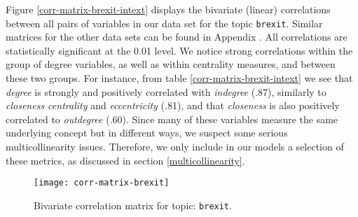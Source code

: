 Figure \vref{corr-matrix-brexit-intext} displays the bivariate (linear) correlations between all pairs of variables in our data set for the topic \texttt{brexit}. Similar matrices for the other data sets can be found in Appendix . All correlations are statistically significant at the 0.01 level. We notice strong correlations within the group of degree variables, as well as within centrality measures, and between these two groups.
For instance, from table \vref{corr-matrix-brexit-intext} we see that \textit{degree} is strongly and positively correlated with \textit{indegree} (.87), similarly to \textit{closeness centrality} and \textit{eccentricity} (.81), and that \textit{closeness} is also positively correlated to \textit{outdegree} (.60). Since many of these variables measure the same underlying concept but in different ways, we suspect some serious multicollinearity issues. Therefore, we only include in our models a selection of these metrics, as discussed in section \vref{multicollinearity}.
\begin{figure}[H]
  \centering
  \caption{Bivariate correlation matrix for topic: \texttt{brexit}.}\label{corr-matrix-brexit-intext}
  \texttt{[image: corr-matrix-brexit]} %
\end{figure}

